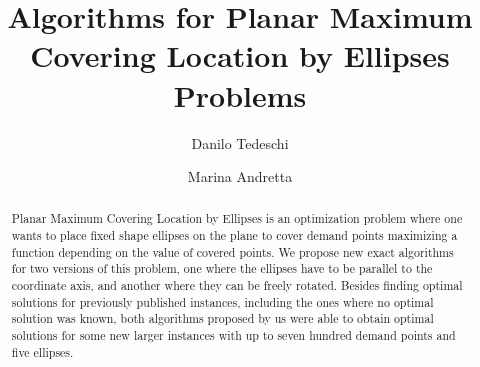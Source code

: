 \documentclass[3p, 11pt]{elsarticle}
\begin{document}
	
	\begin{frontmatter}
		
		
		\title{Algorithms for Planar Maximum Covering Location by Ellipses Problems}
		
		
		
		
		\author[1]{Danilo Tedeschi}

		
		\author[2]{Marina Andretta}
					
		
		
		\begin{abstract}
			Planar Maximum Covering Location by Ellipses is an optimization problem where one wants to place fixed shape ellipses on the plane to cover demand points
			maximizing a function depending on the value of covered points.
			We propose new exact algorithms for two versions of this problem, one where the ellipses have to be parallel to the coordinate axis, and another where they can be freely rotated. 
			Besides finding optimal solutions for previously published instances, including the ones where no optimal solution was known, both algorithms proposed by us were able to obtain optimal solutions for some new larger instances 	with up to seven hundred demand points and five ellipses.
		\end{abstract}
		

\end{frontmatter}
\end{document}
